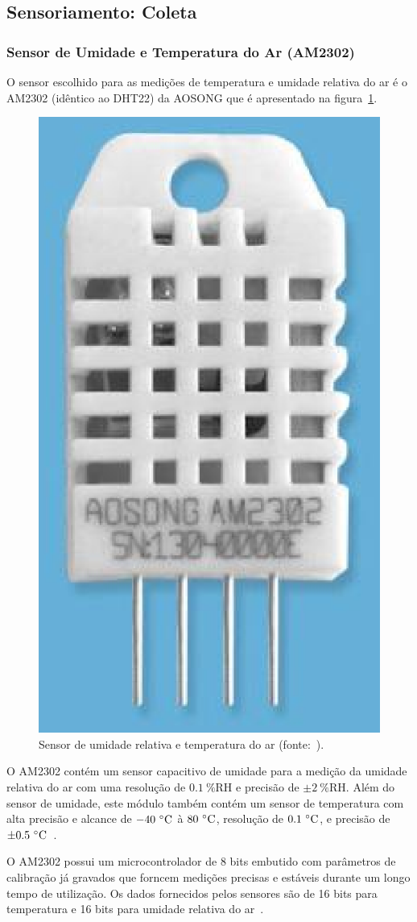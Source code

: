 	
\subsection{Sensoriamento: Coleta}


	\subsubsection{Sensor de Umidade e Temperatura do Ar (AM2302)}

		O sensor escolhido para as medições de temperatura e umidade relativa do ar
		é o AM2302 (idêntico ao DHT22) da AOSONG que é apresentado na figura~\ref{fig:AM2302}. 

		\begin{figure}[!htbp]
		\begin{center}
		\includegraphics[width=.4\textwidth]{figuras/am2302.eps}
		\caption{\label{fig:AM2302}Sensor de umidade relativa e temperatura do ar (fonte:~).}
		\end{center}
		\end{figure}

		O AM2302 contém um sensor capacitivo de umidade para a medição da umidade relativa
		do ar com uma resolução de $0.1~\%\textrm{RH}$ e precisão de $\pm 2~\%\textrm{RH}$.
		Além do sensor de umidade, este módulo também contém um sensor de temperatura com
		alta precisão e alcance de $-40~\celsius$ à $80~\celsius$, resolução de $0.1~\celsius$,
		e precisão de $\pm 0.5~\celsius$~\cite{aosong}.

		O AM2302 possui um microcontrolador de 8 bits embutido com parâmetros de calibração já gravados
		que forncem medições precisas e estáveis durante um longo tempo de utilização.
		Os dados fornecidos pelos sensores são de 16 bits para temperatura e
		16 bits para umidade relativa do ar~\cite{aosong}.

